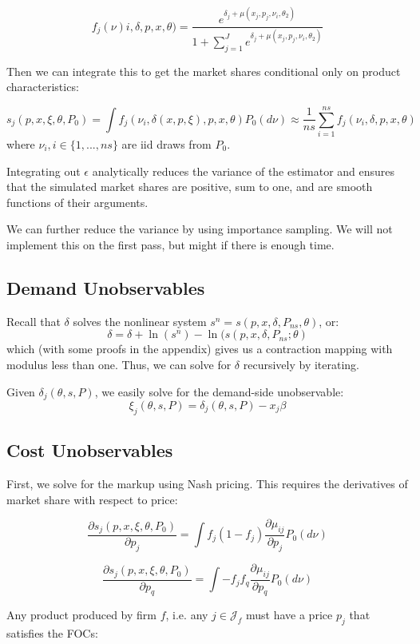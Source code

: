 \documentclass[12pt, oneside]{article}   	%
\newcommand{\parderiv}[2]{ \frac{\partial {#1}}{\partial {#2}}}
\newcommand{\J}{\mathcal{J}}
\begin{document}
$$f_j(\nu)i, \delta, p, x, \theta) = \frac{ e^{\delta_j + \mu(x_j, p_j, \nu_i, \theta_2)}}{1 + \sum_{j=1}^J e^{\delta_j +\mu(x_j, p_j, \nu_i, \theta_2)}} $$

Then we can integrate this to get the market shares conditional only on product characteristics:

$$s_j(p, x, \xi, \theta, P_0) = \int f_j(\nu_i, \delta(x, p, \xi), p, x, \theta)P_0(d\nu) \approx \frac{1}{ns} \sum_{i=1}^{ns} f_j(\nu_i, \delta, p, x, \theta)$$
where $\nu_i, i \in \{1, ..., ns\}$ are iid draws from $P_0$. 

Integrating out $\epsilon$ analytically reduces the variance of the estimator and ensures that the simulated market shares are positive, sum to one, and are smooth functions of their arguments. 

We can further reduce the variance by using importance sampling. We will not implement this on the first pass, but might if there is enough time. 

\subsection{Demand Unobservables}

Recall that $\delta$ solves the nonlinear system $s^n = s(p, x, \delta, P_{ns}, \theta)$, or:
$$\delta = \delta + \ln(s^n) - \ln(s(p, x, \delta, P_{ns};\theta)$$
which (with some proofs in the appendix) gives us a contraction mapping with modulus less than one. Thus, we can solve for $\delta$ recursively by iterating.

Given $\delta_j(\theta, s, P)$, we easily solve for the demand-side unobservable:
$$\xi_j(\theta, s, P) = \delta_j(\theta, s, P) - x_j \beta$$

\subsection{Cost Unobservables}

First, we solve for the markup using Nash pricing. This requires the derivatives of market share with respect to price:

$$\parderiv{s_j(p, x, \xi, \theta, P_0)}{p_j} = \int f_j ( 1 - f_j) \parderiv{\mu_{ij}}{p_j} P_0(d\nu)$$

$$\parderiv{s_j(p, x, \xi, \theta, P_0)}{p_q} = \int -f_j f_q \parderiv{\mu_{ij}}{p_q} P_0(d\nu)$$

Any product produced by firm $f$, i.e. any $j \in \J_f$ must have a price $p_j$ that satisfies the FOCs:
\end{document}
